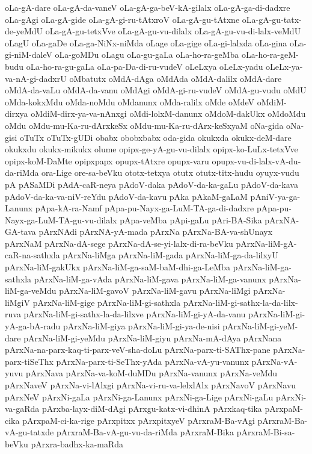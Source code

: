 {oLa-gA-dare
oLa-gA-da-vaneV
oLa-gA-ga-beV-kA-gilalx
oLa-gA-ga-di-dadxre
oLa-gAgi
oLa-gA-gide
oLa-gA-gi-ru-tAtxroV
oLa-gA-gu-tAtxne
oLa-gA-gu-tatx-de-yeMdU
oLa-gA-gu-tetxVve
oLa-gA-gu-vu-dilalx
oLa-gA-gu-vu-di-lalx-veMdU
oLagU
oLa-gaDe
oLa-ga-NiNx-niMda
oLage
oLa-gige
oLa-gi-lalxda
oLa-gina
oLa-gi-niM-daleV
oLa-goMDu
oLagu
oLa-gu-gaLa
oLa-ho-ra-geMba
oLa-ho-ra-geM-budu
oLa-ho-ra-gu-gaLa
oLa-pa-Da-di-ru-vudeV
oLeLxya
oLeLx-yadu
oLeLx-ya-va-nA-gi-dadxrU
oMbatutx
oMdA-dAga
oMdAda
oMdA-dalilx
oMdA-dare
oMdA-da-vaLu
oMdA-da-vanu
oMdAgi
oMdA-gi-ru-vudeV
oMdA-gu-vudu
oMdU
oMda-kokxMdu
oMda-noMdu
oMdanunx
oMda-ralilx
oMde
oMdeV
oMdiM-dirxya
oMdiM-dirx-ya-va-nAnxgi
oMdi-lolxM-danunx
oMdoM-dakUkx
oMdoMdu
oMdu
oMdu-mu-Ka-ru-dArxkeSx
oMdu-mu-Ka-ru-dArx-keSxyaM
oNa-gida
oNa-gisi
oTuTx
oTuTx-gUDi
obabx
obobxbabx
oda-gida
okukxda
okukx-deM-dare
okukxdu
okukx-mikukx
olume
opipx-ge-yA-gu-vu-dilalx
opipx-ko-LuLx-tetxVve
opipx-koM-DaMte
opipxpapx
opupx-tAtxre
opupx-varu
opupx-vu-di-lalx-vA-du-da-riMda
ora-Lige
ore-sa-beVku
ototx-tetxya
otutx
otutx-titx-hudu
oyuyx-vudu
pA
pASaMDi
pAdA-caR-neya
pAdoV-daka
pAdoV-da-ka-gaLu
pAdoV-da-kava
pAdoV-da-ka-va-niV-reYdu
pAdoV-da-kavu
pAka
pAkaM-gaLaM
pAniV-ya-ga-Lanunx
pApa-kA-ra-Namf
pApa-pu-Nayx-ga-LuM-TA-ga-di-dadxre
pApa-pu-Nayx-ga-LuM-TA-gu-vu-dilalx
pApa-veMba
pApi-gaLu
pAri-BA-Sika
pArxNA-GA-tava
pArxNAdi
pArxNA-yA-mada
pArxNa
pArxNa-BA-va-shUnayx
pArxNaM
pArxNa-dA-sege
pArxNa-dA-se-yi-lalx-di-ra-beVku
pArxNa-liM-gA-caR-na-sathxla
pArxNa-liMga
pArxNa-liM-gada
pArxNa-liM-ga-da-lilxyU
pArxNa-liM-gakUkx
pArxNa-liM-ga-saM-baM-dhi-ga-LeMba
pArxNa-liM-ga-sathxla
pArxNa-liM-ga-vAda
pArxNa-liM-gava
pArxNa-liM-ga-vanunx
pArxNa-liM-ga-veMdu
pArxNa-liM-gavoV
pArxNa-liM-gavu
pArxNa-liMgi
pArxNa-liMgiV
pArxNa-liM-gige
pArxNa-liM-gi-sathxla
pArxNa-liM-gi-sathx-la-da-lilx-ruva
pArxNa-liM-gi-sathx-la-da-lilxve
pArxNa-liM-gi-yA-da-vanu
pArxNa-liM-gi-yA-ga-bA-radu
pArxNa-liM-giya
pArxNa-liM-gi-ya-de-nisi
pArxNa-liM-gi-yeM-dare
pArxNa-liM-gi-yeMdu
pArxNa-liM-giyu
pArxNa-mA-dAya
pArxNana
pArxNa-na-parx-kaq-ti-parx-veV-sha-doLu
pArxNa-parx-ti-SAThx-pane
pArxNa-parx-tiSeThx
pArxNa-parx-ti-SeThx-yAda
pArxNa-vA-yu-vanunx
pArxNa-vA-yuvu
pArxNava
pArxNa-va-koM-duMDu
pArxNa-vanunx
pArxNa-veMdu
pArxNaveV
pArxNa-vi-lAlxgi
pArxNa-vi-ru-va-lelxlAlx
pArxNavoV
pArxNavu
pArxNeV
pArxNi-gaLa
pArxNi-ga-Lanunx
pArxNi-ga-Lige
pArxNi-gaLu
pArxNi-va-gaRda
pArxba-layx-diM-dAgi
pArxgu-katx-vi-dhinA
pArxkaq-tika
pArxpaM-cika
pArxpaM-ci-ka-rige
pArxpitxx
pArxpitxyeV
pArxraM-Ba-vAgi
pArxraM-Ba-vA-gu-tatxde
pArxraM-Ba-vA-gu-vu-da-riMda
pArxraM-Bika
pArxraM-Bi-sa-beVku
pArxra-badhx-ka-maRda
}
